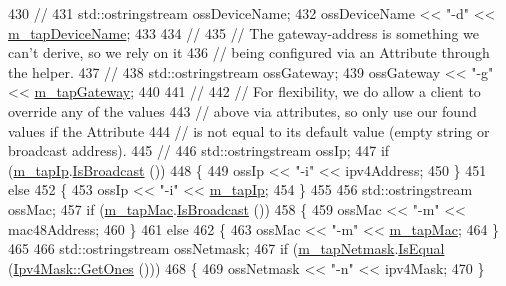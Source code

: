 \begin{DoxyCode}
430       \textcolor{comment}{//}
431       std::ostringstream ossDeviceName;
432       ossDeviceName << \textcolor{stringliteral}{"-d"} << \hyperlink{classns3_1_1TapBridge_af255e0f837eb4dd30c4de28448f862f6}{m\_tapDeviceName};
433 
434       \textcolor{comment}{//}
435       \textcolor{comment}{// The gateway-address is something we can't derive, so we rely on it}
436       \textcolor{comment}{// being configured via an Attribute through the helper.}
437       \textcolor{comment}{//}
438       std::ostringstream ossGateway;
439       ossGateway << \textcolor{stringliteral}{"-g"} << \hyperlink{classns3_1_1TapBridge_ad90dad655607615d92822a361ac21fb1}{m\_tapGateway};
440 
441       \textcolor{comment}{//}
442       \textcolor{comment}{// For flexibility, we do allow a client to override any of the values}
443       \textcolor{comment}{// above via attributes, so only use our found values if the Attribute}
444       \textcolor{comment}{// is not equal to its default value (empty string or broadcast address). }
445       \textcolor{comment}{//}
446       std::ostringstream ossIp;
447       \textcolor{keywordflow}{if} (\hyperlink{classns3_1_1TapBridge_a8cfe2b69cef36dbf048cb9006318b41b}{m\_tapIp}.\hyperlink{classns3_1_1Ipv4Address_acff8d940bf4cc9282cf67c75eb9d777f}{IsBroadcast} ())
448         \{
449           ossIp << \textcolor{stringliteral}{"-i"} << ipv4Address;
450         \}
451       \textcolor{keywordflow}{else}
452         \{
453           ossIp << \textcolor{stringliteral}{"-i"} << \hyperlink{classns3_1_1TapBridge_a8cfe2b69cef36dbf048cb9006318b41b}{m\_tapIp};
454         \}
455 
456       std::ostringstream ossMac;
457       \textcolor{keywordflow}{if} (\hyperlink{classns3_1_1TapBridge_afdaa87d8c5a5e249ee8d94f75183e91f}{m\_tapMac}.\hyperlink{classns3_1_1Mac48Address_ad9909ad21bac501799fb8810bfc58c1e}{IsBroadcast} ())
458         \{
459           ossMac << \textcolor{stringliteral}{"-m"} << mac48Address;
460         \}
461       \textcolor{keywordflow}{else}
462         \{
463           ossMac << \textcolor{stringliteral}{"-m"} << \hyperlink{classns3_1_1TapBridge_afdaa87d8c5a5e249ee8d94f75183e91f}{m\_tapMac};
464         \}
465 
466       std::ostringstream ossNetmask;
467       \textcolor{keywordflow}{if} (\hyperlink{classns3_1_1TapBridge_a9374f832e2a96385651d27a5fbc7ba57}{m\_tapNetmask}.\hyperlink{classns3_1_1Ipv4Mask_a1428fba537359418d0b7d8c84a135a7e}{IsEqual} (\hyperlink{classns3_1_1Ipv4Mask_af712cbdf28c039025d4aa45fa7e243dd}{Ipv4Mask::GetOnes} ()))
468         \{
469           ossNetmask << \textcolor{stringliteral}{"-n"} << ipv4Mask;
470         \}

\end{DoxyCode}
